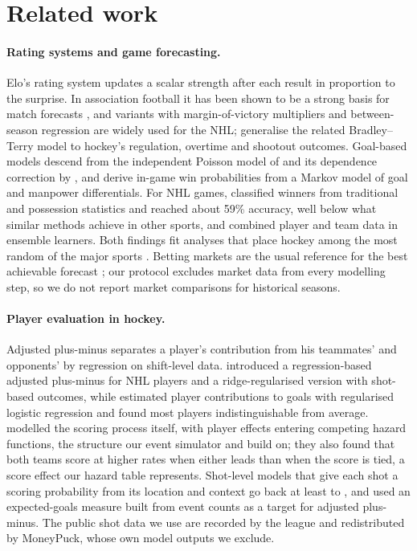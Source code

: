 \section{Related work}
\label{sec:related}

\paragraph{Rating systems and game forecasting.}
Elo's rating system \citep{elo1978rating} updates a scalar strength after
each result in proportion to the surprise. In association football it has been
shown to be a strong basis for match forecasts \citep{hvattum2010using}, and
variants with margin-of-victory multipliers and between-season regression are
widely used for the NHL; \citet{whelan2021bradley} generalise the related
Bradley--Terry model to hockey's regulation, overtime and shootout outcomes.
Goal-based models descend from the independent Poisson model of
\citet{maher1982modelling} and its dependence correction by
\citet{dixon1997modelling}, and \citet{kaplan2014markov} derive in-game win
probabilities from a Markov model of goal and manpower differentials. For NHL
games, \citet{weissbock2013use} classified winners from traditional and
possession statistics and reached about 59\% accuracy, well below what similar
methods achieve in other sports, and \citet{gu2019game} combined player and
team data in ensemble learners. Both findings fit analyses that place hockey
among the most random of the major sports
\citep{bennaim2006parity,lopez2018often}. Betting markets are the usual
reference for the best achievable forecast
\citep{strumbelj2014determining,wunderlich2021forecasting}; our protocol
excludes market data from every modelling step, so we do not report market
comparisons for historical seasons.

\paragraph{Player evaluation in hockey.}
Adjusted plus-minus separates a player's contribution from his teammates' and
opponents' by regression on shift-level data. \citet{macdonald2011regression}
introduced a regression-based adjusted plus-minus for NHL players and
\citet{macdonald2012adjusted} a ridge-regularised version
\citep{hoerl1970ridge} with shot-based outcomes, while
\citet{gramacy2013estimating} estimated player contributions to goals with
regularised logistic regression and found most players indistinguishable from
average. \citet{thomas2013competing} modelled the scoring process itself, with
player effects entering competing hazard functions, the structure our event
simulator and \neurhlG{} build on; they also found that both teams score at
higher rates when either leads than when the score is tied, a score effect our
hazard table represents. Shot-level models that give each shot a scoring
probability from its location and context go back at least to
\citet{krzywicki2005shot}, and \citet{macdonald2012expected} used an
expected-goals measure built from event counts as a target for adjusted
plus-minus. The public shot data we use are recorded by the league and
redistributed by MoneyPuck, whose own model outputs we exclude.

